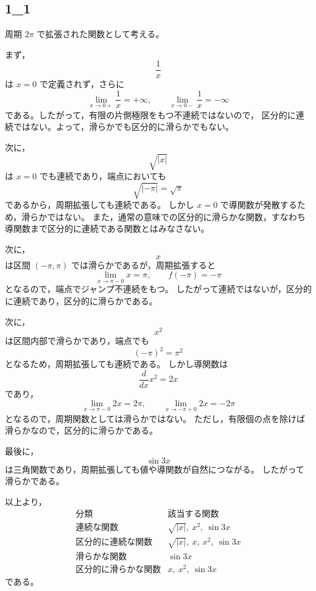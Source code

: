 
\subsection{1_1}
\begin{solution}
	周期 \(2\pi\) で拡張された関数として考える。
	
	まず，
	\[
	\frac{1}{x}
	\]
	は \(x=0\) で定義されず，さらに
	\[
	\lim_{x\to 0+}\frac{1}{x}=+\infty,
	\qquad
	\lim_{x\to 0-}\frac{1}{x}=-\infty
	\]
	である。したがって，有限の片側極限をもつ不連続ではないので，
	区分的に連続ではない。よって，滑らかでも区分的に滑らかでもない。
	
	次に，
	\[
	\sqrt{|x|}
	\]
	は \(x=0\) でも連続であり，端点においても
	\[
	\sqrt{|-\pi|}=\sqrt{\pi}
	\]
	であるから，周期拡張しても連続である。
	しかし \(x=0\) で導関数が発散するため，滑らかではない。
	また，通常の意味での区分的に滑らかな関数，すなわち導関数まで区分的に連続である関数とはみなさない。
	
	次に，
	\[
	x
	\]
	は区間 \((-\pi,\pi)\) では滑らかであるが，周期拡張すると
	\[
	\lim_{x\to \pi-0}x=\pi,
	\qquad
	f(-\pi)=-\pi
	\]
	となるので，端点でジャンプ不連続をもつ。
	したがって連続ではないが，区分的に連続であり，区分的に滑らかである。
	
	次に，
	\[
	x^2
	\]
	は区間内部で滑らかであり，端点でも
	\[
	(-\pi)^2=\pi^2
	\]
	となるため，周期拡張しても連続である。
	しかし導関数は
	\[
	\frac{d}{dx}x^2=2x
	\]
	であり，
	\[
	\lim_{x\to \pi-0}2x=2\pi,
	\qquad
	\lim_{x\to -\pi+0}2x=-2\pi
	\]
	となるので，周期関数としては滑らかではない。
	ただし，有限個の点を除けば滑らかなので，区分的に滑らかである。
	
	最後に，
	\[
	\sin 3x
	\]
	は三角関数であり，周期拡張しても値や導関数が自然につながる。
	したがって滑らかである。
	
	以上より，
	\[
	\begin{array}{c|l}
		\text{分類} & \text{該当する関数} \\ \hline
		\text{連続な関数}
		&
		\sqrt{|x|},\ x^2,\ \sin 3x
		\\[2mm]
		\text{区分的に連続な関数}
		&
		\sqrt{|x|},\ x,\ x^2,\ \sin 3x
		\\[2mm]
		\text{滑らかな関数}
		&
		\sin 3x
		\\[2mm]
		\text{区分的に滑らかな関数}
		&
		x,\ x^2,\ \sin 3x
	\end{array}
	\]
	である。
\end{solution}